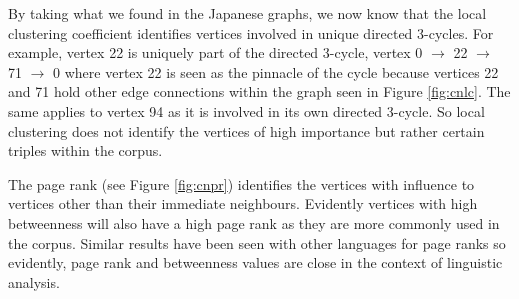 By taking what we found in the Japanese graphs, we now know that the local clustering coefficient identifies vertices involved in unique directed 3-cycles. For example, vertex 22 is uniquely part of the directed 3-cycle, vertex 0 $\rightarrow$ 22 $\rightarrow$ 71 $\rightarrow$ 0 where vertex 22 is seen as the pinnacle of the cycle because vertices 22 and 71 hold other edge connections within the graph seen in Figure \ref{fig:cnlc}. The same applies to vertex 94 as it is involved in its own directed 3-cycle. So local clustering does not identify the vertices of high importance but rather certain triples within the corpus.

The page rank (see Figure \ref{fig:cnpr}) identifies the vertices with influence to vertices other than their immediate neighbours. Evidently vertices with high betweenness will also have a high page rank as they are more commonly used in the corpus. Similar results have been seen with other languages for page ranks so evidently, page rank and betweenness values are close in the context of linguistic analysis.

